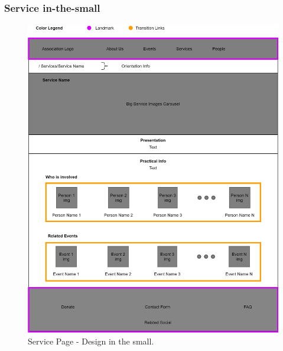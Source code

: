 \clearpage

\subsubsection{Service in-the-small}
\begin{figure}[h!]
		\centering
		\begin{minipage}[b]{1\textwidth}
    			\includegraphics[width=\textwidth]{./assets/servicedetails.png}
			\caption{Service Page - Design in the small.}
		\end{minipage}
\end{figure}
\FloatBarrier

\clearpage

